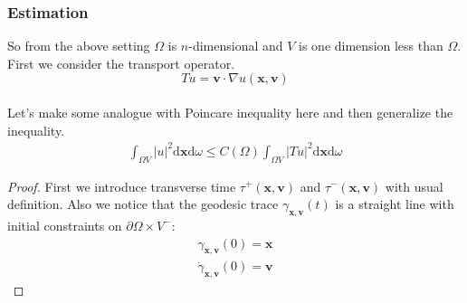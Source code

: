 \documentclass[12pt,a4paper]{article}
\newtheorem{proof}{Proof}[subsection]
\begin{document}
\subsubsection{Estimation}
So from the above setting $\Omega$ is $n$-dimensional and $V$ is one dimension less than $\Omega$.
First we consider the transport operator.
$$Tu = \mathbf{v}\cdot \nabla u(\mathbf{x},\mathbf{v})$$\\
Let's make some analogue with Poincare inequality here and then generalize the inequality.
\begin{eqnarray}
\int_{\Omega V} |u|^2 \mathrm{d}\mathbf{x}\mathrm{d}\omega \le C(\Omega)\int_{\Omega V} |Tu|^2 \mathrm{d}\mathbf{x}\mathrm{d}\omega 
\end{eqnarray}
\begin{proof}
First we introduce transverse time $\tau^{+}(\mathbf{x},\mathbf{v})$ and $\tau^{-}(\mathbf{x},\mathbf{v})$ with usual definition. Also we notice that the geodesic trace $\gamma_{\mathbf{x},\mathbf{v}}(t)$ is a straight line with initial constraints on $\partial\Omega\times V^{-}$:
\begin{eqnarray}
\gamma_{\mathbf{x},\mathbf{v}}(0) = \mathbf{x}\\
\dot{\gamma}_{\mathbf{x},\mathbf{v}}(0) = \mathbf{v}
\end{eqnarray}

\end{proof}
\end{document}
